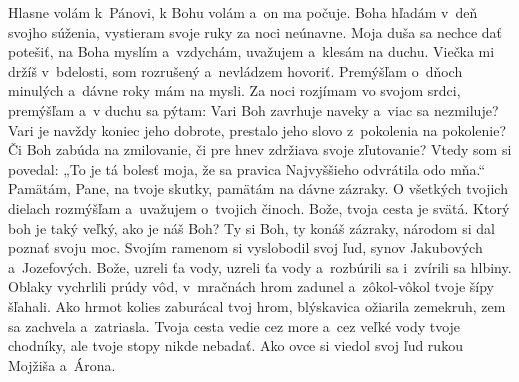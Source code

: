 Hlasne volám k~Pánovi,
k Bohu volám a~on ma počuje.
\versseparator
Boha hľadám v~deň svojho súženia,
vystieram svoje ruky za noci
neúnavne.
\versseparator
Moja duša sa nechce dať potešiť,
na Boha myslím a~vzdychám,
uvažujem a~klesám na duchu.
\versseparator
Viečka mi držíš v~bdelosti,
som rozrušený a~nevládzem hovoriť.
\versseparator
Premýšľam o~dňoch minulých
a~dávne roky mám na mysli.
\versseparator
Za noci rozjímam vo svojom srdci,
premýšľam a~v duchu sa pýtam:
\versseparator
Vari Boh zavrhuje naveky
a~viac sa nezmiluje?
\versseparator
Vari je navždy koniec jeho dobrote,
prestalo jeho slovo z~pokolenia na pokolenie?
\versseparator
Či Boh zabúda na zmilovanie,
či pre hnev zdržiava svoje zľutovanie?
\versseparator
Vtedy som si povedal: „To je tá bolesť moja,
že sa pravica Najvyššieho odvrátila odo mňa.“
\versseparator
Pamätám, Pane, na tvoje skutky,
pamätám na dávne zázraky.
\versseparator
O všetkých tvojich dielach rozmýšľam
a~uvažujem o~tvojich činoch.
\versseparator
Bože, tvoja cesta je svätá.
Ktorý boh je taký veľký, ako je náš Boh?
Ty si Boh, ty konáš zázraky,
\versseparator
národom si dal poznať svoju moc.
Svojím ramenom si vyslobodil svoj ľud,
synov Jakubových a~Jozefových.
\versseparator
Bože, uzreli ťa vody,
uzreli ťa vody a~rozbúrili sa
 i~zvírili sa hlbiny.
\versseparator
Oblaky vychrlili prúdy vôd,
v~mračnách hrom zadunel
\versseparator
a~zôkol-vôkol tvoje šípy šľahali.
Ako hrmot kolies zaburácal tvoj hrom,
\versseparator
blýskavica ožiarila zemekruh,
zem sa zachvela a~zatriasla.
\versseparator
Tvoja cesta vedie cez more a~cez veľké vody tvoje chodníky,
ale tvoje stopy nikde nebadať.
\versseparator
Ako ovce si viedol svoj ľud
rukou Mojžiša a~Árona.